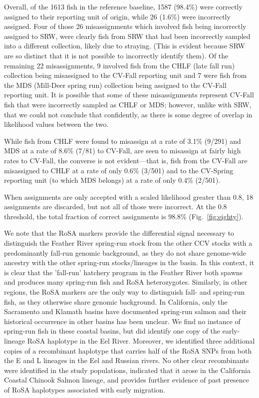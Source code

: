 Overall, of the 1613 fish in the reference baseline, 1587 (98.4\%) were correctly
assigned to their reporting unit of origin, while 26 (1.6\%) were incorrectly assigned.
Four of those 26 misassignments which involved fish being incorrectly assigned to
SRW, were clearly fish from SRW that had been incorrectly sampled into a different
collection, likely due to straying. (This is evident because SRW are so distinct that it is not possible
to incorrectly identify them).  Of the remaining 22 misassignments,  9 involved fish from the
CHLF (late fall run) collection being misassigned to the CV-Fall reporting unit and 7 were
fish from the MDS (Mill-Deer spring run) collection being assigned to the CV-Fall reporting unit.
It is possible that some of these misassignments represent CV-Fall fish that were incorrectly
sampled as CHLF or MDS; however, unlike with SRW, that we could not conclude that
confidently, as there is some degree of overlap in likelihood values between the two.

While fish from CHLF were found to misassign at a rate of 3.1\% (9/291) and MDS at a rate 
of 8.6\% (7/81) to CV-Fall, are seen to misassign at fairly high rates to CV-Fall, the
converse is not evident---that is, fish from the CV-Fall are misassigned to CHLF at a rate
of only 0.6\% (3/501) and to the CV-Spring reporting unit (to which MDS belongs) at a rate
of only 0.4\% (2/501).  

When assignments are only accepted with a scaled likelihood greater than 0.8,
18 assignments are discarded, but not all of those were incorrect.  At the 0.8 threshold,
the total fraction of correct assignments is 98.8\% (Fig.~\ref{fig:eighty}).

We note that the RoSA markers provide the differential signal necessary to distinguish the
Feather River spring-run stock from the other CCV stocks with a predominantly fall-run
genomic background, as they do not share genome-wide ancestry with the other spring-run
stocks/lineages in the basin. In this context, it is clear that the 'fall-run' hatchery
program in the Feather River both spawns and produces many spring-run fish and RoSA heterozygotes.
Similarly, in other regions, the RoSA markers are the only way to distinguish fall-
and spring-run fish, as they otherwise share genomic background. 
In California, only the Sacramento and  Klamath basins have documented spring-run
salmon and their historical occurrence in other basins has been unclear. We find no
instance of spring-run fish in these coastal basins, but did identify one copy of the early-lineage
RoSA haplotype in the Eel River. Moreover, we identified three additional copies of a
recombinant haplotype that carries half of the RoSA SNPs from both the E and L lineages in the Eel and Russian rivers. No other clear recombinants were identified in the study populations, indicated that it arose in the California Coastal Chinook Salmon lineage, and provides further evidence of past presence of RoSA haplotypes associated with early migration.





